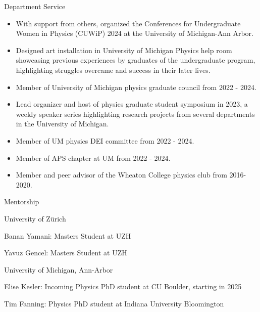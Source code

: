 \documentclass{resume} %
\begin{document}
\begin{rSection}{Department Service}
    \begin{itemize}
        \item With support from others, organized the Conferences for Undergraduate Women in Physics (CUWiP) 2024 at the University of Michigan-Ann Arbor.
        \item Designed art installation in University of Michigan Physics help room showcasing previous experiences by graduates of the undergraduate program, highlighting struggles overcame and success in their later lives.
        \item Member of University of Michigan physics graduate council from 2022 - 2024. 
        \item Lead organizer and host of physics graduate student symposium in 2023, a weekly speaker series highlighting research projects from several departments in the University of Michigan.
    	\item Member of UM physics DEI committee from 2022 - 2024.
	\item Member of APS chapter at UM from 2022 - 2024.
        \item Member and peer advisor of the Wheaton College physics club from 2016-2020.
    \end{itemize}
\end{rSection}
\newpage
\begin{rSection}{Mentorship}
\begin{rSubsection}{University of Zürich}{}{}{}
    \item Banan Yamani: Masters Student at UZH
    \item Yavuz Gencel: Masters Student at UZH
\end{rSubsection}

\begin{rSubsection}{University of Michigan, Ann-Arbor}{}{}{}
    \item Elise Kesler: Incoming Physics PhD student at CU Boulder, starting in 2025
    \item Tim Fanning: Physics PhD student at Indiana University Bloomington
\end{rSubsection}

\end{rSection}

%
\end{document}
